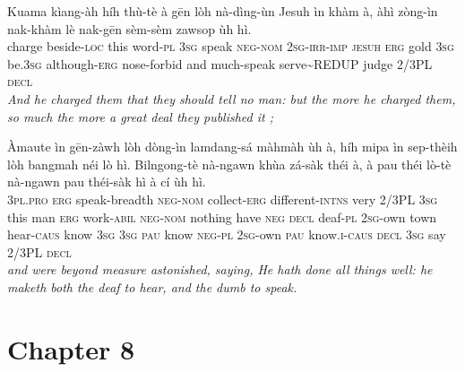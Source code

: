 \documentclass[11pt,a4paper]{article}
\begin{document}
\begin{exe}
\gll Kuama kìang-àh híh thù-tè à gēn lòh nà-dìng-ùn Jesuh ìn khàm à, àhì zòng-ìn nak-khàm lè nak-gēn sèm-sèm zawsop ùh hì. \\
     charge beside-\textsc{loc} this word-\textsc{pl} \textsc{3sg} speak \textsc{neg}-\textsc{nom} \textsc{2sg}-\textsc{irr}-\textsc{imp} \textsc{jesuh} \textsc{erg} gold \textsc{3sg} be.\textsc{3sg} although-\textsc{erg} nose-forbid and much-speak serve\textasciitilde{}REDUP judge 2/3PL \textsc{decl} \\
\glt \textcolor{kjvcolor}{\textit{And he charged them that they should tell no man: but the more he charged them, so much the more a great deal they published it ;}}

\gll Àmaute ìn gēn-zàwh lòh dòng-ìn lamdang-sá màhmàh ùh à, híh mipa ìn sep-thèih lòh bangmah néi lò hì. Bilngong-tè nà-ngawn khùa zá-sàk théi à, à pau théi lò-tè nà-ngawn pau théi-sàk hì à cí ùh hì. \\
     \textsc{3pl}.\textsc{pro} \textsc{erg} speak-breadth \textsc{neg}-\textsc{nom} collect-\textsc{erg} different-\textsc{intns} very 2/3PL \textsc{3sg} this man \textsc{erg} work-\textsc{abil} \textsc{neg}-\textsc{nom} nothing have \textsc{neg} \textsc{decl} deaf-\textsc{pl} \textsc{2sg}-own town hear-\textsc{caus} know \textsc{3sg} \textsc{3sg} \textsc{pau} know \textsc{neg}-\textsc{pl} \textsc{2sg}-own \textsc{pau} know.\textsc{i}-\textsc{caus} \textsc{decl} \textsc{3sg} say 2/3PL \textsc{decl} \\
\glt \textcolor{kjvcolor}{\textit{and were beyond measure astonished, saying, He hath done all things well: he maketh both the deaf to hear, and the dumb to speak.}}

\end{exe}
\newpage

\section*{Chapter 8}
\end{document}
